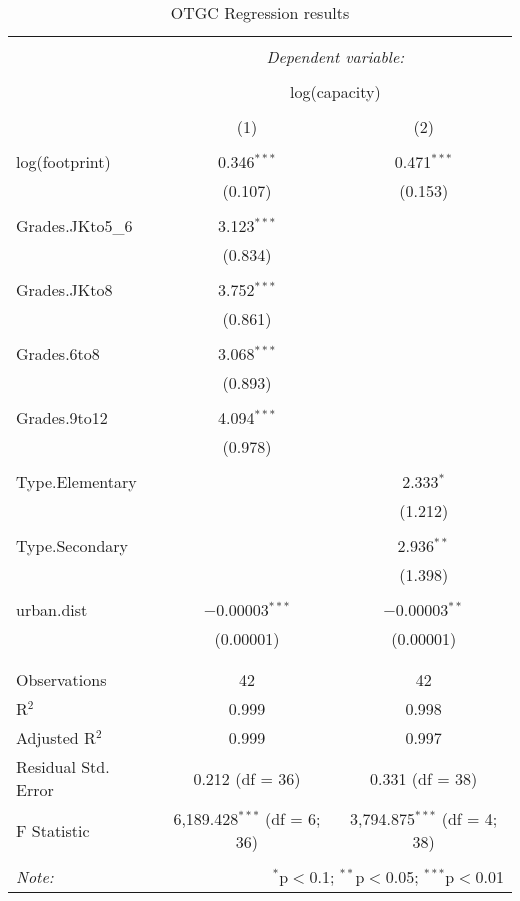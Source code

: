 
\begin{table}[!htbp] \centering 
  \caption{OTGC Regression results} 
  \label{TabA1-OTGC} 
\begin{tabular}{@{\extracolsep{5pt}}lcc} 
\\[-1.8ex]\hline 
\hline \\[-1.8ex] 
 & \multicolumn{2}{c}{\textit{Dependent variable:}} \\ 
\\[-1.8ex] & \multicolumn{2}{c}{log(capacity)} \\ 
\\[-1.8ex] & (1) & (2)\\ 
\hline \\[-1.8ex] 
 log(footprint) & 0.346$^{***}$ & 0.471$^{***}$ \\ 
  & (0.107) & (0.153) \\ 
  & & \\ 
 Grades.JKto5\_6 & 3.123$^{***}$ &  \\ 
  & (0.834) &  \\ 
  & & \\ 
 Grades.JKto8 & 3.752$^{***}$ &  \\ 
  & (0.861) &  \\ 
  & & \\ 
 Grades.6to8 & 3.068$^{***}$ &  \\ 
  & (0.893) &  \\ 
  & & \\ 
 Grades.9to12 & 4.094$^{***}$ &  \\ 
  & (0.978) &  \\ 
  & & \\ 
 Type.Elementary &  & 2.333$^{*}$ \\ 
  &  & (1.212) \\ 
  & & \\ 
 Type.Secondary &  & 2.936$^{**}$ \\ 
  &  & (1.398) \\ 
  & & \\ 
 urban.dist & $-$0.00003$^{***}$ & $-$0.00003$^{**}$ \\ 
  & (0.00001) & (0.00001) \\ 
  & & \\ 
\hline \\[-1.8ex] 
Observations & 42 & 42 \\ 
R$^{2}$ & 0.999 & 0.998 \\ 
Adjusted R$^{2}$ & 0.999 & 0.997 \\ 
Residual Std. Error & 0.212 (df = 36) & 0.331 (df = 38) \\ 
F Statistic & 6,189.428$^{***}$ (df = 6; 36) & 3,794.875$^{***}$ (df = 4; 38) \\ 
\hline 
\hline \\[-1.8ex] 
\textit{Note:}  & \multicolumn{2}{r}{$^{*}$p$<$0.1; $^{**}$p$<$0.05; $^{***}$p$<$0.01} \\ 
\end{tabular} 
\end{table} 
